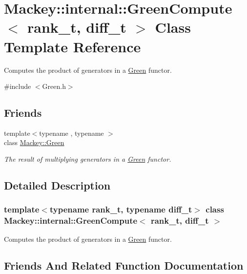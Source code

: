 \hypertarget{classMackey_1_1internal_1_1GreenCompute}{}\section{Mackey\+:\+:internal\+:\+:Green\+Compute$<$ rank\+\_\+t, diff\+\_\+t $>$ Class Template Reference}
\label{classMackey_1_1internal_1_1GreenCompute}


Computes the product of generators in a \hyperlink{classMackey_1_1Green}{Green} functor.  




{\ttfamily \#include $<$Green.\+h$>$}

\subsection*{Friends}
\begin{DoxyCompactItemize}
\item 
{\footnotesize template$<$typename , typename $>$ }\\class \hyperlink{classMackey_1_1internal_1_1GreenCompute_a1ab71a61751d67ece5b0504aaf9560f1}{Mackey\+::\+Green}
\begin{DoxyCompactList}\small\item\em The result of multiplying generators in a \hyperlink{classMackey_1_1Green}{Green} functor. \end{DoxyCompactList}\end{DoxyCompactItemize}


\subsection{Detailed Description}
\subsubsection*{template$<$typename rank\+\_\+t, typename diff\+\_\+t$>$\newline
class Mackey\+::internal\+::\+Green\+Compute$<$ rank\+\_\+t, diff\+\_\+t $>$}

Computes the product of generators in a \hyperlink{classMackey_1_1Green}{Green} functor. 

\subsection{Friends And Related Function Documentation}
\mbox{\label{classMackey_1_1internal_1_1GreenCompute_a1ab71a61751d67ece5b0504aaf9560f1}} 
